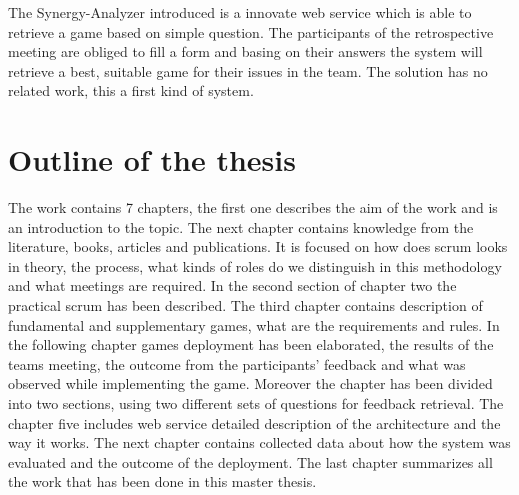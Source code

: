The Synergy-Analyzer introduced is a innovate web service which is able to retrieve a game based on simple question. The participants of the retrospective meeting are obliged to fill a form and basing on their answers the system will retrieve a best, suitable game for their issues in the team. The solution has no related work, this a first kind of system.

\section{Outline of the thesis}

The work contains 7 chapters, the first one describes the aim of the work and is an introduction to the topic. The next chapter contains knowledge from the literature, books, articles and publications. It is focused on how does scrum looks in theory, the process, what kinds of roles do we distinguish in this methodology and what meetings are required. In the second section of chapter two the practical scrum has been described. The third chapter contains description of fundamental and supplementary games, what are the requirements and rules. In the following chapter games deployment has been elaborated, the results of the teams meeting, the outcome from the participants' feedback and what was observed while implementing the game. Moreover the chapter has been divided into two sections, using two different sets of questions for feedback retrieval. The chapter five includes web service detailed description of the architecture and the way it works. The next chapter contains collected data about how the system was evaluated and the outcome of the deployment. The last chapter summarizes all the work that has been done in this master thesis.














